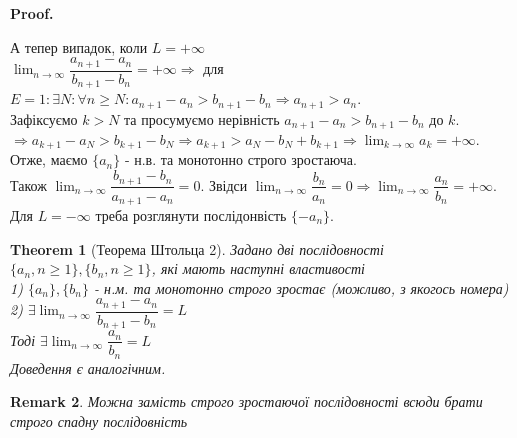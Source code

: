 \documentclass[a4paper, 14pt]{article}
\makeatletter
\def\qed{$\blacksquare$}
\theoremstyle{theoremdd}
\newtheorem{theorem}{Theorem}[subsection]
\theoremstyle{theoremdd}
\theoremstyle{theoremdd}
\theoremstyle{theoremdd}
\theoremstyle{theoremdd}
\theoremstyle{theoremdd}
\newtheorem{remark}[theorem]{Remark}
\theoremstyle{theoremdd}
\theoremstyle{theoremdd}
\renewenvironment{proof}[1][Proof.\\]{\par
\pushQED{\hfill \qed}%
\normalfont \topsep6\p@\@plus6\p@\relax
\trivlist
\item\relax
{\bfseries
#1\@addpunct{.}}\hspace\labelsep\ignorespaces
}{%
\popQED\endtrivlist\@endpefalse
}
\makeatother
\begin{document}
\begin{proof}
	А тепер випадок, коли $L = +\infty$ \\
	$\displaystyle \lim_{n \to \infty} \dfrac{a_{n+1} - a_n}{b_{n+1} - b_n} = + \infty \Rightarrow$ для $E = 1: \exists N: \forall n \geq N: a_{n+1} - a_n > b_{n+1} - b_n \Rightarrow a_{n+1} > a_n$.\\
	Зафіксуємо $k > N$ та просумуємо нерівність $a_{n+1} - a_n > b_{n+1} - b_n$ до $k$.\\
	$\Rightarrow a_{k+1} - a_N > b_{k+1} - b_N \Rightarrow a_{k+1} > a_N-b_N + b_{k+1} \Rightarrow \displaystyle\lim_{k \to \infty} a_k = +\infty$.\\
	Отже, маємо $\{a_n\}$ - н.в. та монотонно строго зростаюча.\\
	Також $\displaystyle \lim_{n \to \infty} \dfrac{b_{n+1} - b_n}{a_{n+1} - a_n} = 0$.
	Звідси $\displaystyle \lim_{n \to \infty} \dfrac{b_n}{a_n} = 0 \Rightarrow \lim_{n \to \infty} \dfrac{a_n}{b_n} = + \infty$.
	\bigskip \\
	Для $L = -\infty$ треба розглянути послідонвість $\{-a_n\}$.
	\end{proof}
	
	\begin{theorem}[Теорема Штольца 2]
	Задано дві послідовності $\{a_n, n \geq 1\}, \{b_n, n \geq 1\}$, які мають наступні властивості\\
	1) $\{a_n\}, \{b_n\}$ - н.м. та монотонно строго зростає (можливо, з якогось номера)\\
	2) $\exists \displaystyle \lim_{n \to \infty} \dfrac{a_{n+1} - a_n}{b_{n+1} - b_n} = L$\\
	Тоді $\exists \displaystyle \lim_{n \to \infty} \dfrac{a_n}{b_n} = L$\\
	\textit{Доведення є аналогічним.}
	\end{theorem}
	
	\begin{remark}
	Можна замість строго зростаючої послідовності всюди брати строго спадну послідовність
	\end{remark}
	
\end{document}
